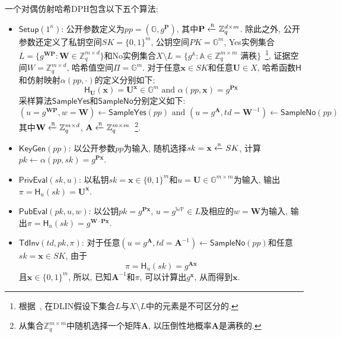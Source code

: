 \begin{construction}[对偶仿射哈希]
一个对偶仿射哈希$\text{DPH}$包含以下五个算法:
\begin{itemize}
\item $\mathsf{Setup}(1^\kappa)$: 公开参数定义为$pp = (\mathbb{G}, g^{\mathbf{P}})$, 其中$\mathbf{P} \xleftarrow{\textup{\tiny R}} \mathbb{Z}_q^{d \times m}$. 除此之外, 公开参数还定义了私钥空间$SK = \{0, 1\}^m$, 公钥空间$PK = \mathbb{G}^m$, Yes实例集合$L = \{g^{\mathbf{W}\mathbf{P}} : \mathbf{W} \in \mathbb{Z}_q^{m \times d}\}$和No实例集合$X \setminus L = \{g^{\mathbb{A}} : \mathbb{A} \in \mathbb{Z}_q^{m \times m} \text{ 满秩}\}$~\footnote{根据~\cite{BonehHHO08}, 在DLIN假设下集合$L$与$X \setminus L$中的元素是不可区分的.}, 证据空间$W = \mathbb{Z}_q^{m \times d}$, 哈希值空间$\Pi = \mathbb{G}^m$. 对于任意$\mathbf{x} \in SK$和任意$\mathbf{U} \in X$, 哈希函数$\mathsf{H}$和仿射映射$\alpha(pp, \cdot)$的定义分别如下: 
\[
\mathsf{H}_{\mathbf{U}}(\mathbf{x}) = \mathbf{U}^{\mathbf{x}} \in \mathbb{G}^m \text{ and }\alpha(pp, \mathbf{x}) = g^{\mathbf{P}\mathbf{x}}
\]
采样算法$\mathsf{SampleYes}$和$\mathsf{SampleNo}$分别定义如下:
\[
(u = g^{\mathbf{W}\mathbf{P}}, w = \mathbf{W}) \leftarrow \mathsf{SampleYes}(pp) \text{ and } (u = g^{\mathbf{A}}, td = \mathbf{W}^{-1}) \leftarrow \mathsf{SampleNo}(pp)
\]
其中$\mathbf{W} \xleftarrow{\textup{\tiny R}} \mathbb{Z}_q^{m \times d}$, $\mathbf{A} \xleftarrow{\textup{\tiny R}} \mathbb{Z}_q^{m \times m}$~\footnote{从集合$\mathbb{Z}_q^{m \times m}$中随机选择一个矩阵$\mathbf{A}$, 以压倒性地概率$\mathbf{A}$是满秩的.}.

\item $\mathsf{KeyGen}(pp)$: 以公开参数$pp$为输入, 随机选择$sk = \mathbf{x} \xleftarrow{\textup{\tiny R}} SK$, 计算$pk \leftarrow \alpha(pp, sk) = g^{\mathbf{P}\mathbf{x}}$.

\item $\mathsf{PrivEval}(sk, u)$: 以私钥$sk = \mathbf{x} \in \{0, 1\}^m$和$u = \mathbf{U} \in \mathbb{G}^{m \times m}$为输入, 输出$\pi = \mathsf{H}_u(sk) = \mathbf{U}^{\mathbf{x}}$.

\item $\mathsf{PubEval}(pk, u, w)$: 以公钥$pk = g^{\mathbf{P}\mathbf{x}}$, $u = g^{\mathbb{W}\mathbb{P}} \in L$及相应的$w = \mathbf{W}$为输入, 输出$\pi = \mathsf{H}_u(sk) = g^{\mathbf{W} \cdot \mathbf{P}\mathbf{x}}$.

\item $\mathsf{TdInv}(td, pk, \pi)$: 对于任意$(u = g^{\mathbf{A}}, td = \mathbf{A}^{-1}) \leftarrow \mathsf{SampleNo}(pp)$和任意$sk = \mathbf{x} \in SK$, 由于
\[
\pi = \mathsf{H}_u(sk) = g^{\mathbf{A}\mathbf{x}}
\] 
且$\mathbf{x} \in \{0, 1\}^m$, 所以, 已知$\mathbf{A}^{-1}$和$\pi$, 可以计算出$g^{\mathbf{x}}$, 从而得到$\mathbf{x}$. 
\end{itemize}
\end{construction} 











